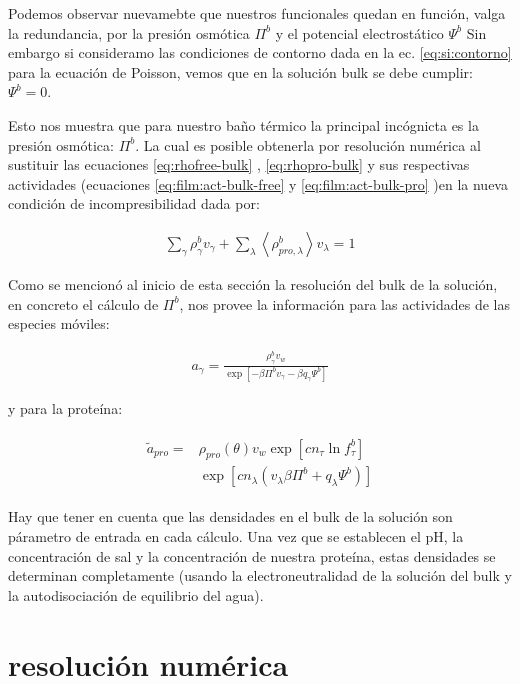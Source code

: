 Podemos observar nuevamebte que nuestros funcionales quedan en funci\'on, valga la redundancia, por la presi\'on osm\'otica $\Pi^b$ y el potencial electrost\'atico $\Psi^b$
Sin embargo si consideramo las condiciones de contorno dada en la ec. \ref{eq:si:contorno} para la ecuaci\'on de Poisson, vemos que en la soluci\'on bulk se debe cumplir: $\Psi^b = 0$. 

Esto nos muestra que para nuestro ba\~no t\'ermico la principal inc\'ognicta es la presi\'on osm\'otica: $\Pi^b$.
La cual es posible obtenerla por resoluci\'on num\'erica al sustituir las ecuaciones  \ref{eq:rhofree-bulk} ,  \ref{eq:rhopro-bulk}  y sus respectivas actividades (ecuaciones \ref{eq:film:act-bulk-free} y \ref{eq:film:act-bulk-pro} )en la nueva condici\'on de incompresibilidad dada por:

\begin{align}
	\sum_\gamma \rho^b_\gamma v_\gamma + \sum_\lambda\left< \rho^b_{pro,\lambda}\right> v_\lambda = 1
	\label{eq:incom-bulk}
\end{align}

Como se mencion\'o al inicio de esta secci\'on la resoluci\'on del bulk de la soluci\'on, en concreto el c\'alculo de $\Pi^b$, nos provee la informaci\'on para las actividades de las especies m\'oviles:

\begin{align}
	a_\gamma =\frac{\rho^b_\gamma v_w}{\exp\left[-\beta \Pi^b v_\gamma - \beta q_\gamma\Psi^b\right]}
	\label{eq:film:act-bulk-free}
\end{align}

 y para la prote\'ina:

\begin{align}
	\begin{aligned}
		\tilde{a}_{pro} = & \rho_{pro}(\theta)v_w\exp\left[cn_\tau \ln f^b_\tau\right] \\
		& \exp \left[cn_\lambda (v_\lambda\beta\Pi^b + q_\lambda \Psi^b) \right]
	\end{aligned}
\label{eq:film:act-bulk-pro}
\end{align}


Hay que tener en cuenta que las densidades en el bulk de la soluci\'on son p\'arametro de entrada en cada c\'alculo. Una vez que se establecen el pH, la concentraci\'on de sal y la concentraci\'on de nuestra prote\'ina, estas densidades se determinan completamente (usando la electroneutralidad de la soluci\'on del bulk y la autodisociaci\'on de equilibrio del agua).

\section{resoluci\'on num\'erica}

